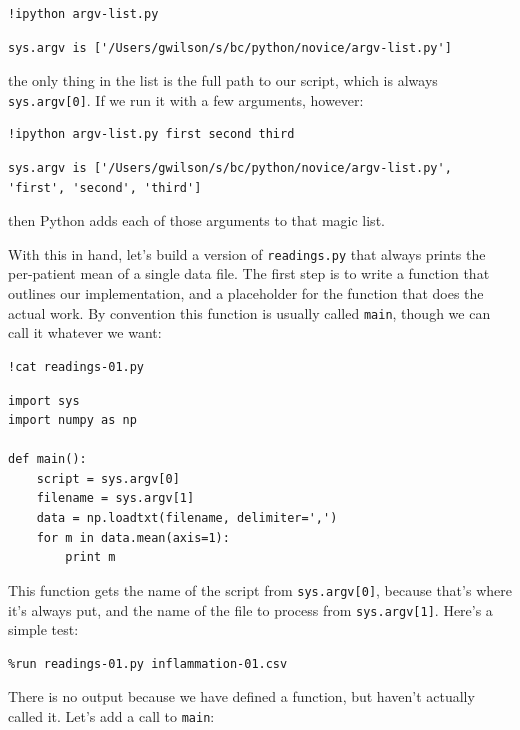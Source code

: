 \documentclass{book}
\begin{document}
\begin{verbatim}
!ipython argv-list.py
\end{verbatim}

\begin{verbatim}
sys.argv is ['/Users/gwilson/s/bc/python/novice/argv-list.py']
\end{verbatim}

the only thing in the list is the full path to our script, which is
always \texttt{sys.argv{[}0{]}}. If we run it with a few arguments,
however:

\begin{verbatim}
!ipython argv-list.py first second third
\end{verbatim}

\begin{verbatim}
sys.argv is ['/Users/gwilson/s/bc/python/novice/argv-list.py', 'first', 'second', 'third']
\end{verbatim}

then Python adds each of those arguments to that magic list.

With this in hand, let's build a version of \texttt{readings.py} that
always prints the per-patient mean of a single data file. The first step
is to write a function that outlines our implementation, and a
placeholder for the function that does the actual work. By convention
this function is usually called \texttt{main}, though we can call it
whatever we want:

\begin{verbatim}
!cat readings-01.py
\end{verbatim}

\begin{verbatim}
import sys
import numpy as np

def main():
    script = sys.argv[0]
    filename = sys.argv[1]
    data = np.loadtxt(filename, delimiter=',')
    for m in data.mean(axis=1):
        print m
\end{verbatim}

This function gets the name of the script from \texttt{sys.argv{[}0{]}},
because that's where it's always put, and the name of the file to
process from \texttt{sys.argv{[}1{]}}. Here's a simple test:

\begin{verbatim}
%run readings-01.py inflammation-01.csv
\end{verbatim}

There is no output because we have defined a function, but haven't
actually called it. Let's add a call to \texttt{main}:
\end{document}
